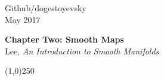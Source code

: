 \documentclass[10pt,letter]{article}
\begin{document}
\noindent Github/dogestoyevsky \\
May 2017
\begin{center}
\textbf{Chapter Two: Smooth Maps}\\ Lee, \textit{An Introduction to Smooth Manifolds}

\line(1,0){250}
\end{center}
\end{document}
